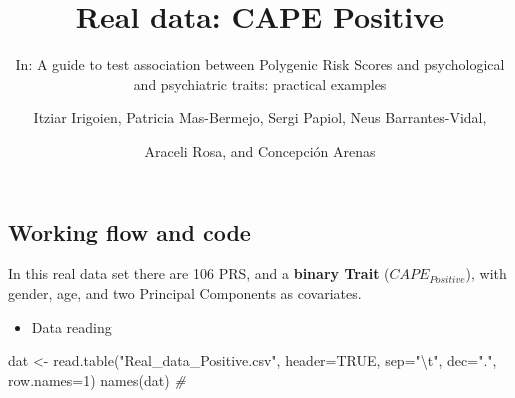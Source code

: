 \documentclass[
]{article}
\title{Real data: CAPE Positive}
\subtitle{In: A guide to test association between Polygenic Risk Scores
and psychological and psychiatric traits: practical examples}
\author{Itziar Irigoien, Patricia Mas-Bermejo, Sergi Papiol, Neus
Barrantes-Vidal, \and Araceli Rosa, and Concepción Arenas}
\date{}
\newenvironment{Shaded}{\begin{snugshade}}{\end{snugshade}}
\newcommand{\AttributeTok}[1]{\textcolor[rgb]{0.77,0.63,0.00}{#1}}
\newcommand{\CommentTok}[1]{\textcolor[rgb]{0.56,0.35,0.01}{\textit{#1}}}
\newcommand{\ConstantTok}[1]{\textcolor[rgb]{0.00,0.00,0.00}{#1}}
\newcommand{\DecValTok}[1]{\textcolor[rgb]{0.00,0.00,0.81}{#1}}
\newcommand{\FunctionTok}[1]{\textcolor[rgb]{0.00,0.00,0.00}{#1}}
\newcommand{\NormalTok}[1]{#1}
\newcommand{\OtherTok}[1]{\textcolor[rgb]{0.56,0.35,0.01}{#1}}
\newcommand{\SpecialCharTok}[1]{\textcolor[rgb]{0.00,0.00,0.00}{#1}}
\newcommand{\StringTok}[1]{\textcolor[rgb]{0.31,0.60,0.02}{#1}}
\providecommand{\tightlist}{%
  \setlength{\itemsep}{0pt}\setlength{\parskip}{0pt}}
\begin{document}
\maketitle

\hypertarget{working-flow-and-code}{%
\subsection{Working flow and code}\label{working-flow-and-code}}

In this real data set there are 106 PRS, and a \textbf{binary Trait}
(\(CAPE_{Positive}\)), with gender, age, and two Principal Components as
covariates.

\begin{itemize}
\tightlist
\item
  Data reading
\end{itemize}

\begin{Shaded}
\begin{Highlighting}[]
\NormalTok{dat }\OtherTok{\textless{}{-}} \FunctionTok{read.table}\NormalTok{(}\StringTok{"Real\_data\_Positive.csv"}\NormalTok{, }\AttributeTok{header=}\ConstantTok{TRUE}\NormalTok{, }\AttributeTok{sep=}\StringTok{"}\SpecialCharTok{\textbackslash{}t}\StringTok{"}\NormalTok{, }\AttributeTok{dec=}\StringTok{"."}\NormalTok{, }\AttributeTok{row.names=}\DecValTok{1}\NormalTok{)}
\FunctionTok{names}\NormalTok{(dat) }\CommentTok{\#}
\end{Highlighting}
\end{Shaded}
\end{document}
